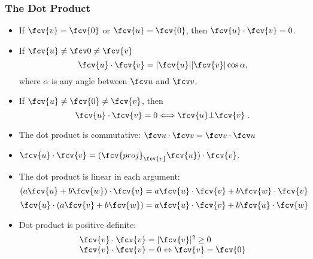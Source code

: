 \begin{frame}
\frametitle{The Dot Product}
\begin{itemize}
\item If $\fcv{v}=\fcv{0}$ or $\fcv{u}=\fcv{0}$, then $\fcv{u}\cdot \fcv{v} =0$.
\item<+-> If $\fcv{u} \neq \fcv 0 \neq \fcv{v}$
\[
\fcv{u} \cdot \fcv{v} = |\fcv{u}|  |\fcv{v}| \cos{\alpha},
\]
where $\alpha$ is any angle between $\fcv u$ and $\fcv v$.
\item<+-> If $\fcv{u}\neq \fcv{0} \neq \fcv{v}$, then
$$\fcv{u} \cdot \fcv{v} = 0 \Longleftrightarrow \fcv{u} \bot \fcv{v}\; .$$
\item<+-> The dot product is commutative: $\fcv u \cdot \fcv v= \fcv v \cdot \fcv u$
\item<+-> $\fcv{u} \cdot \fcv{v} = (\fcv{proj}_{\fcv{v}} \fcv{u}) \cdot \fcv{v}$.
\item<+-> The dot product is linear in each argument:
\[
(a \fcv{u} + b \fcv{w}) \cdot \fcv{v} = a \fcv{u} \cdot \fcv{v} + b \fcv{w} \cdot \fcv{v}
\]
\[
\fcv{u} \cdot (a \fcv{v} + b \fcv{w}) = a \fcv{u} \cdot \fcv{v} + b \fcv{u} \cdot \fcv{w}
\]
\item<+-> Dot product is positive definite:
\[
\begin{array}{l}
\fcv{v} \cdot \fcv{v} = |\fcv{v}|^2 \geq 0 \\
\fcv{v}\cdot \fcv{v} = 0 \Leftrightarrow \fcv{v}=\fcv{0}
\end{array}
\]
\end{itemize}

\end{frame}